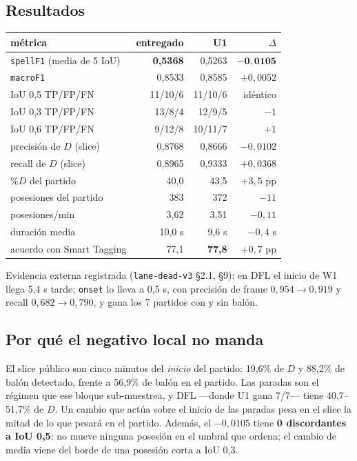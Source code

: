 \documentclass[11pt,a4paper]{article}
\begin{document}
\subsection{Resultados}

\begin{table}[h]
\centering
\begin{tabular}{lrrr}
\toprule
métrica & entregado & U1 & $\Delta$ \\
\midrule
\texttt{spellF1} (media de 5 IoU) & \textbf{0,5368} & 0,5263 & $\mathbf{-0{,}0105}$ \\
\texttt{macroF1} & 0,8533 & 0,8585 & $+0{,}0052$ \\
IoU 0,5 TP/FP/FN & 11/10/6 & 11/10/6 & idéntico \\
IoU 0,3 TP/FP/FN & 13/8/4 & 12/9/5 & $-1$ \\
IoU 0,6 TP/FP/FN & 9/12/8 & 10/11/7 & $+1$ \\
precisión de $D$ (slice) & 0,8768 & 0,8666 & $-0{,}0102$ \\
recall de $D$ (slice) & 0,8965 & 0,9333 & $+0{,}0368$ \\
$\%D$ del partido & 40,0 & 43,5 & $+3{,}5$ pp \\
posesiones del partido & 383 & 372 & $-11$ \\
posesiones/min & 3,62 & 3,51 & $-0{,}11$ \\
duración media & 10,0 s & 9,6 s & $-0{,}4$ s \\
acuerdo con Smart Tagging & 77,1 & \textbf{77,8} & $+0{,}7$ pp \\
\bottomrule
\end{tabular}
\end{table}

Evidencia externa registrada (\texttt{lane-dead-v3} \S2.1, \S9): en DFL el inicio de W1 llega
5,4 s tarde; \texttt{onset} lo lleva a 0,5 s, con precisión de frame $0{,}954 \to 0{,}919$ y
recall $0{,}682 \to 0{,}790$, y gana los 7 partidos con y sin balón.

\subsection{Por qué el negativo local no manda}

El slice público son cinco minutos del \emph{inicio} del partido: 19,6\% de $D$ y 88,2\% de balón
detectado, frente a 56,9\% de balón en el partido. Las paradas son el régimen que ese bloque
sub-muestrea, y DFL ---donde U1 gana 7/7--- tiene 40,7--51,7\% de $D$. Un cambio que actúa sobre el
inicio de las paradas pesa en el slice la mitad de lo que pesará en el partido. Además, el
$-0{,}0105$ tiene \textbf{0 discordantes a IoU 0,5}: no mueve ninguna posesión en el umbral que
ordena; el cambio de media viene del borde de una posesión corta a IoU 0,3.
\end{document}
